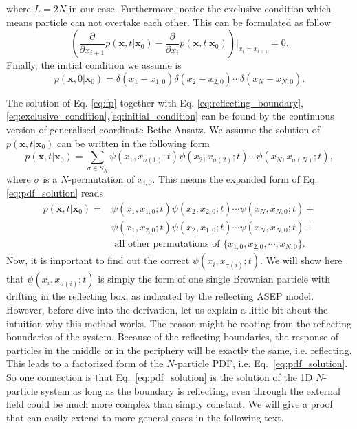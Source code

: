 where $L=2N$ in our case. Furthermore, notice the exclusive condition which means particle can not overtake each other. This can be formulated as follow
\begin{equation}
    \label{eq:exclusive_condition}
    \left(\frac{\partial}{\partial x_{i+1}}p(\mathbf{x},t|\mathbf{x}_0) - \frac{\partial}{\partial x_{i}} p(\mathbf{x},t|\mathbf{x}_0) \right)\Bigg|_{x_{i}=x_{i+1}} = 0.
\end{equation}
Finally, the initial condition we assume is
\begin{equation}
    \label{eq:initial_condition}
    p(\mathbf{x}, 0 | \mathbf{x}_0) = \delta(x_1-x_{1,0})\delta(x_2-x_{2,0})\cdots\delta(x_N-x_{N,0}).
\end{equation}

The solution of Eq. \eqref{eq:fp} together with Eq.  \eqref{eq:reflecting_boundary},\eqref{eq:exclusive_condition},\eqref{eq:initial_condition} can be found by the continuous version of generalised coordinate Bethe Ansatz.  We assume the solution of $p(\mathbf{x}, t | \mathbf{x}_0)$ can be written in the following form
\begin{equation}
    \label{eq:pdf_solution}
    p(\mathbf{x}, t | \mathbf{x}_0) = \sum_{\sigma\in S_{N}}{\psi(x_1, x_{\sigma(1)};t)\psi(x_2, x_{\sigma(2)};t)\cdots\psi(x_N, x_{\sigma(N)};t)},
\end{equation}
where $\sigma$ is a $N$-permutation of $x_{i,0}$. This means the expanded form of Eq. \eqref{eq:pdf_solution} reads
\begin{equation}
    \begin{aligned}
    \label{eq:pdf_solution_expanded}
    p(\mathbf{x}, t | \mathbf{x}_0) = &
    {\psi(x_1, x_{1,0};t)\psi(x_2, x_{2,0};t)\cdots\psi(x_N,x_{N,0};t)} + \\
    & {\psi(x_1, x_{2,0};t)\psi(x_2, x_{1,0};t)\cdots\psi(x_N,x_{N,0};t)} + \\
    & \text{ all other permutations of } \{x_{1,0}, x_{2,0}, \cdots, x_{N,0}\}.
    \end{aligned}
\end{equation}
Now, it is important to find out the correct $\psi(x_i, x_{\sigma(i)};t)$.  We will show here that $\psi(x_i, x_{\sigma(i)};t)$ is simply the form of one single Brownian particle with drifting in the reflecting box, as indicated by the reflecting ASEP model. 
However, before dive into the derivation, let us explain a little bit about the intuition why this method works. The reason might be rooting from the reflecting boundaries of the system. Because of the reflecting boundaries, the response of particles in the middle or in the periphery will be exactly the same, i.e. reflecting. This leads to a factorized form of the $N$-particle PDF, i.e. Eq.~\eqref{eq:pdf_solution}. So one connection is that Eq.~\eqref{eq:pdf_solution} is the solution of the 1D $N$-particle system as long as the boundary is reflecting, even through the external field could be much more complex than simply constant. We will give a proof that can easily extend to more general cases in the following text.

